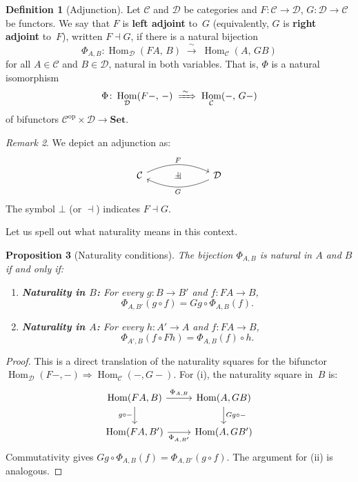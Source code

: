 \documentclass[a4paper,12pt]{book}
\DeclareMathOperator{\Hom}{Hom}
\newcommand{\Set}{\mathbf{Set}}
\newcommand{\op}{\mathrm{op}}
\theoremstyle{definition}
\newtheorem{definition}{Definition}[section]
\theoremstyle{plain}
\newtheorem{proposition}[definition]{Proposition}
\theoremstyle{remark}
\newtheorem{remark}[definition]{Remark}
\begin{document}
\begin{definition}[Adjunction]\label{def:adjunction}
Let $\mathcal{C}$ and $\mathcal{D}$ be categories and
$F\colon\mathcal{C}\to\mathcal{D}$,
$G\colon\mathcal{D}\to\mathcal{C}$ be functors.
We say that $F$ is \textbf{left adjoint} to~$G$
(equivalently, $G$ is \textbf{right adjoint} to~$F$),
written $F\dashv G$, if there is a natural bijection
\[
    \Phi_{A,B}\colon
    \Hom_{\mathcal{D}}(FA,\,B)
    \;\xrightarrow{\;\sim\;}\;
    \Hom_{\mathcal{C}}(A,\,GB)
\]
for all $A\in\mathcal{C}$ and $B\in\mathcal{D}$,
natural in both variables.  That is, $\Phi$ is a natural isomorphism
\[
    \Phi\colon \Hom_{\mathcal{D}}(F-,\,-)
    \;\xRightarrow{\;\sim\;}\;
    \Hom_{\mathcal{C}}(-,\,G-)
\]
of bifunctors $\mathcal{C}^{\op}\times\mathcal{D}\to\Set$.
\end{definition}

\begin{remark}\label{rem:adj-notation}
We depict an adjunction as:
\[
\begin{tikzcd}
\mathcal{C}
  \arrow[rr, bend left=25, "F", ""{name=F, below}]
& \bot &
\mathcal{D}
  \arrow[ll, bend left=25, "G", ""{name=G, above}]
  \arrow[from=F, to=G, phantom, "\dashv"]
\end{tikzcd}
\]
The symbol $\bot$ (or $\dashv$) indicates $F\dashv G$.
\end{remark}

Let us spell out what naturality means in this context.

\begin{proposition}[Naturality conditions]\label{prop:adj-naturality}
The bijection $\Phi_{A,B}$ is natural in $A$ and $B$ if and only if:
\begin{enumerate}[label=(\roman*)]
\item \textbf{Naturality in $B$:}
For every $g\colon B\to B'$ and $f\colon FA\to B$,
\[
    \Phi_{A,B'}(g\circ f) = Gg \circ \Phi_{A,B}(f).
\]
\item \textbf{Naturality in $A$:}
For every $h\colon A'\to A$ and $f\colon FA\to B$,
\[
    \Phi_{A',B}(f\circ Fh) = \Phi_{A,B}(f)\circ h.
\]
\end{enumerate}
\end{proposition}

\begin{proof}
This is a direct translation of the naturality squares for the
bifunctor $\Hom_\mathcal{D}(F-,-) \Rightarrow \Hom_\mathcal{C}(-,G-)$.
For (i), the naturality square in~$B$ is:
\[
\begin{tikzcd}
\Hom(FA,B) \arrow[r, "\Phi_{A,B}"] \arrow[d, "g\circ -"'] &
\Hom(A,GB) \arrow[d, "Gg\circ -"] \\
\Hom(FA,B') \arrow[r, "\Phi_{A,B'}"'] & \Hom(A,GB')
\end{tikzcd}
\]
Commutativity gives $Gg\circ\Phi_{A,B}(f) = \Phi_{A,B'}(g\circ f)$.
The argument for (ii) is analogous.
\end{proof}
\end{document}
